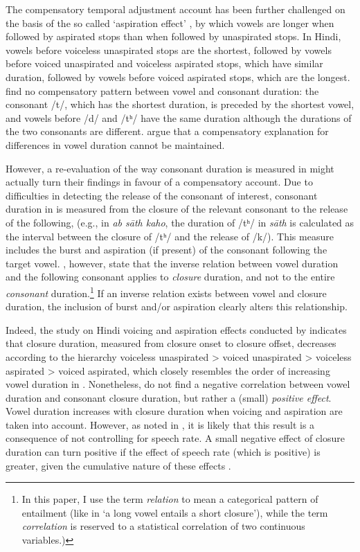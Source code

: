\documentclass[12pt,]{article}
\let\rmarkdownfootnote\footnote%
\def\footnote{\protect\rmarkdownfootnote}
\begin{document}
The compensatory temporal adjustment account has been further challenged
on the basis of the so called `aspiration effect' \citep{maddieson1976},
by which vowels are longer when followed by aspirated stops than when
followed by unaspirated stops. In Hindi, vowels before voiceless
unaspirated stops are the shortest, followed by vowels before voiced
unaspirated and voiceless aspirated stops, which have similar duration,
followed by vowels before voiced aspirated stops, which are the longest.
\citet{maddieson1976} find no compensatory pattern between vowel and
consonant duration: the consonant /t/, which has the shortest duration,
is preceded by the shortest vowel, and vowels before /d/ and /tʰ/ have
the same duration although the durations of the two consonants are
different. \citet{maddieson1976} argue that a compensatory explanation
for differences in vowel duration cannot be maintained.

However, a re-evaluation of the way consonant duration is measured in
\citet{maddieson1976} might actually turn their findings in favour of a
compensatory account. Due to difficulties in detecting the release of
the consonant of interest, consonant duration in \citet{maddieson1976}
is measured from the closure of the relevant consonant to the release of
the following, (e.g., in \emph{ab sāth kaho}, the duration of /tʰ/ in
\emph{sāth} is calculated as the interval between the closure of /tʰ/
and the release of /k/). This measure includes the burst and aspiration
(if present) of the consonant following the target vowel.
\citet{slis1969a}, however, state that the inverse relation between
vowel duration and the following consonant applies to \textit{closure}
duration, and not to the entire \textit{consonant}
duration.\footnote{In this paper, I use the term \textit{relation} to mean a categorical pattern of entailment (like in `a long vowel entails a short closure'), while the term \textit{correlation} is reserved to a statistical correlation of two continuous variables.)}
If an inverse relation exists between vowel and closure duration, the
inclusion of burst and/or aspiration clearly alters this relationship.

Indeed, the study on Hindi voicing and aspiration effects conducted by
\citet{durvasula2012} indicates that closure duration, measured from
closure onset to closure offset, decreases according to the hierarchy
voiceless unaspirated \textgreater{} voiced unaspirated \textgreater{}
voiceless aspirated \textgreater{} voiced aspirated, which closely
resembles the order of increasing vowel duration in
\citet{maddieson1976}. Nonetheless, \citet{durvasula2012} do not find a
negative correlation between vowel duration and consonant closure
duration, but rather a (small) \emph{positive effect}. Vowel duration
increases with closure duration when voicing and aspiration are taken
into account. However, as noted in \citet{begus2017}, it is likely that
this result is a consequence of not controlling for speech rate. A small
negative effect of closure duration can turn positive if the effect of
speech rate (which is positive) is greater, given the cumulative nature
of these effects \citep[p. 2177]{begus2017}.
\end{document}
